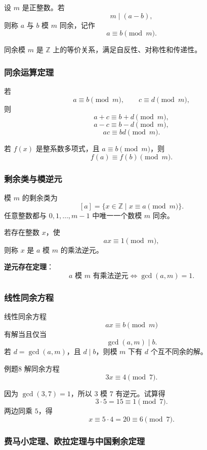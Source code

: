 设 \(m\) 是正整数。若
\[
m\mid(a-b),
\]
则称 \(a\) 与 \(b\) 模 \(m\) 同余，记作
\[
a\equiv b\pmod m.
\]

同余模 \(m\) 是 \(\mathbb Z\) 上的等价关系，满足自反性、对称性和传递性。

\subsubsection{同余运算定理}

若
\[
a\equiv b\pmod m,\qquad c\equiv d\pmod m,
\]
则
\[
a+c\equiv b+d\pmod m,
\]
\[
a-c\equiv b-d\pmod m,
\]
\[
ac\equiv bd\pmod m.
\]

若 \(f(x)\) 是整系数多项式，且 \(a\equiv b\pmod m\)，则
\[
f(a)\equiv f(b)\pmod m.
\]

\subsubsection{剩余类与模逆元}

模 \(m\) 的剩余类为
\[
[a]=\{x\in\mathbb Z\mid x\equiv a\pmod m\}.
\]
任意整数都与 \(0,1,\dots,m-1\) 中唯一一个数模 \(m\) 同余。

若存在整数 \(x\)，使
\[
ax\equiv1\pmod m,
\]
则称 \(x\) 是 \(a\) 模 \(m\) 的乘法逆元。

\textbf{逆元存在定理}：
\[
a\text{ 模 }m\text{ 有乘法逆元}\Leftrightarrow \gcd(a,m)=1.
\]

\subsubsection{线性同余方程}

线性同余方程
\[
ax\equiv b\pmod m
\]
有解当且仅当
\[
\gcd(a,m)\mid b.
\]
若 \(d=\gcd(a,m)\)，且 \(d\mid b\)，则模 \(m\) 下有 \(d\) 个互不同余的解。

\begin{question}{例题8}
	解同余方程
	\[
	3x\equiv 4\pmod 7.
	\]
	
	\begin{solution}
	因为 \(\gcd(3,7)=1\)，所以 \(3\) 模 \(7\) 有逆元。试算得
	\[
	3\cdot5=15\equiv1\pmod7.
	\]
	两边同乘 \(5\)，得
	\[
	x\equiv 5\cdot4=20\equiv6\pmod7.
	\]
	\end{solution}
\end{question}

\subsubsection{费马小定理、欧拉定理与中国剩余定理}

